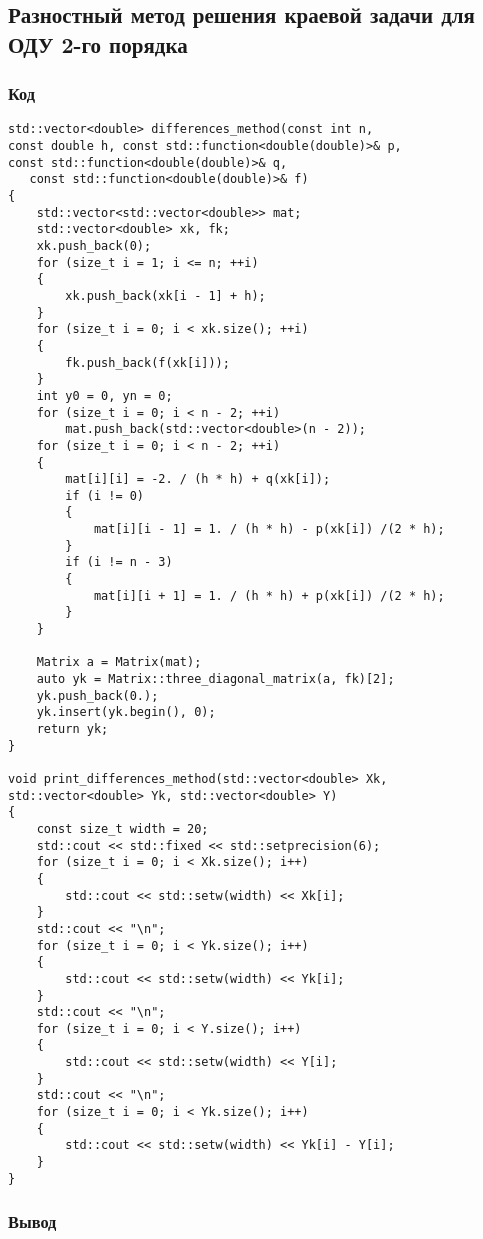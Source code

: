 \documentclass[bachelor, och, pract]{SCWorks}
\begin{document}
\subsection{Разностный метод решения краевой задачи
для ОДУ 2-го порядка}

\subsubsection{Код}

\begin{lstlisting}
std::vector<double> differences_method(const int n, 
const double h, const std::function<double(double)>& p,
const std::function<double(double)>& q, 
   const std::function<double(double)>& f)
{
    std::vector<std::vector<double>> mat;
    std::vector<double> xk, fk;
    xk.push_back(0);
    for (size_t i = 1; i <= n; ++i)
    {
        xk.push_back(xk[i - 1] + h);
    }
    for (size_t i = 0; i < xk.size(); ++i)
    {
        fk.push_back(f(xk[i]));
    }
    int y0 = 0, yn = 0;
    for (size_t i = 0; i < n - 2; ++i)
        mat.push_back(std::vector<double>(n - 2));
    for (size_t i = 0; i < n - 2; ++i)
    {
        mat[i][i] = -2. / (h * h) + q(xk[i]);
        if (i != 0)
        {
            mat[i][i - 1] = 1. / (h * h) - p(xk[i]) /(2 * h);
        }
        if (i != n - 3)
        {
            mat[i][i + 1] = 1. / (h * h) + p(xk[i]) /(2 * h);
        }
    }

    Matrix a = Matrix(mat);
    auto yk = Matrix::three_diagonal_matrix(a, fk)[2];
    yk.push_back(0.);
    yk.insert(yk.begin(), 0);
    return yk;
}

void print_differences_method(std::vector<double> Xk, 
std::vector<double> Yk, std::vector<double> Y)
{
    const size_t width = 20;
    std::cout << std::fixed << std::setprecision(6);
    for (size_t i = 0; i < Xk.size(); i++)
    {
        std::cout << std::setw(width) << Xk[i];
    }
    std::cout << "\n";
    for (size_t i = 0; i < Yk.size(); i++)
    {
        std::cout << std::setw(width) << Yk[i];
    }
    std::cout << "\n";
    for (size_t i = 0; i < Y.size(); i++)
    {
        std::cout << std::setw(width) << Y[i];
    }
    std::cout << "\n";
    for (size_t i = 0; i < Yk.size(); i++)
    {
        std::cout << std::setw(width) << Yk[i] - Y[i];
    }
}
\end{lstlisting}

\subsubsection{Вывод}
\end{document}
